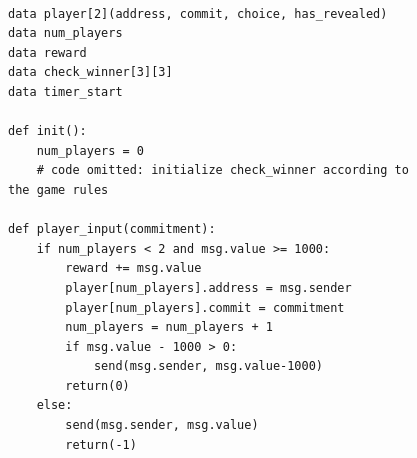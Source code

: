 \documentclass[10pt,twocolumn,letterpaper]{article}
\begin{document}
\begin{figure}
\centering
\begin{minipage}{\columnwidth}%
\begin{mdframed}
\begin{verbatim}

data player[2](address, commit, choice, has_revealed)
data num_players
data reward
data check_winner[3][3]
data timer_start

def init():
	num_players = 0
	# code omitted: initialize check_winner according to the game rules

def player_input(commitment):
	if num_players < 2 and msg.value >= 1000:
		reward += msg.value
		player[num_players].address = msg.sender
		player[num_players].commit = commitment
		num_players = num_players + 1
		if msg.value - 1000 > 0:
			send(msg.sender, msg.value-1000)
		return(0)
	else:	
		send(msg.sender, msg.value)
		return(-1)
		

\end{verbatim}
\end{mdframed}
\end{minipage}
\end{figure}
\end{document}
